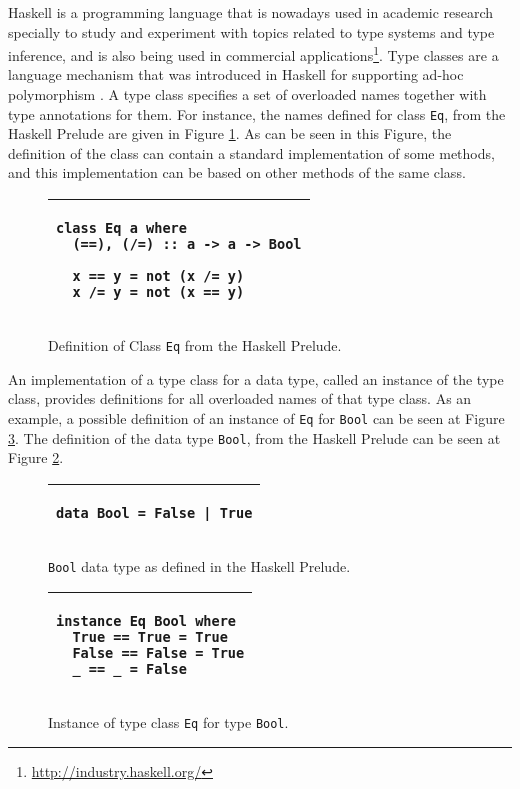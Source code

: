 \documentclass[msc]{ppgccufmg}
\begin{document}
Haskell is a programming language that is nowadays used in academic research specially to study and experiment with topics related to type systems and type inference, and is also being used in commercial applications\footnote{\url{http://industry.haskell.org/}}.
Type classes are a language mechanism that was introduced in Haskell for supporting ad-hoc polymorphism \citep{tch}.
A type class specifies a set of overloaded names together with type annotations for them.
For instance, the names defined for class \texttt{Eq}, from the Haskell Prelude \citep{report} are given in Figure \ref{Eq}.
As can be seen in this Figure, the definition of the class can contain a standard implementation of some methods, and this implementation can be based on other methods of the same class.

\begin{figure}
\caption{Definition of Class \texttt{Eq} from the Haskell Prelude.\label{Eq}}
\begin{tabular}{|p{\textwidth}|}
\hline
\begin{verbatim}
class Eq a where
  (==), (/=) :: a -> a -> Bool

  x == y = not (x /= y)
  x /= y = not (x == y)
\end{verbatim}
\\
\hline
\end{tabular}
\end{figure}

An implementation of a type class for a data type, called an instance of the type class, provides definitions for all overloaded names of that type class.
As an example, a possible definition of an instance of \texttt{Eq} for \texttt{Bool} can be seen at Figure \ref{EqBool}.
The definition of the data type \texttt{Bool}, from the Haskell Prelude \citep{report} can be seen at Figure \ref{Bool}.

\begin{figure}
\caption{\texttt{Bool} data type as defined in the Haskell Prelude.\label{Bool}}
\begin{tabular}{|p{\textwidth}|}
\hline
\begin{verbatim}
data Bool = False | True
\end{verbatim}
\\
\hline
\end{tabular}
\end{figure}

\begin{figure}
\caption{Instance of type class \texttt{Eq} for type \texttt{Bool}.\label{EqBool}}
\begin{tabular}{|p{\textwidth}|}
\hline
\begin{verbatim}
instance Eq Bool where
  True == True = True
  False == False = True
  _ == _ = False
\end{verbatim}
\\
\hline
\end{tabular}
\end{figure}
\end{document}
